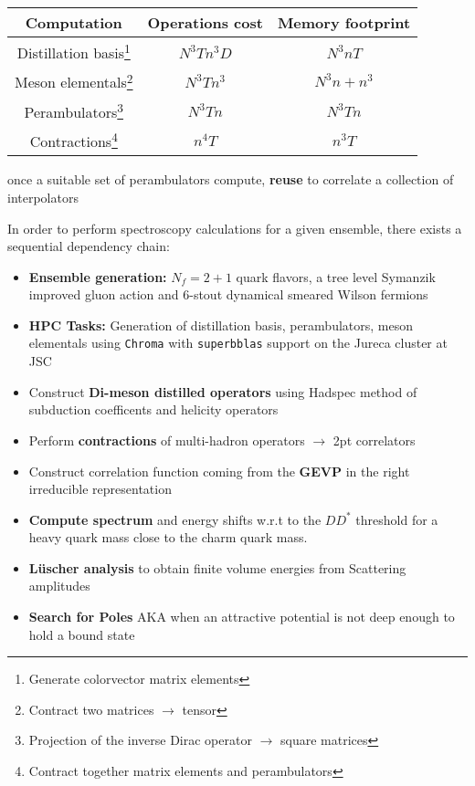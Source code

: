          \begin{minipage}{16cm}
        \hspace*{2em}\begin{tabular}{ccc}
        Computation    & Operations cost & Memory footprint \\ \hline
        Distillation basis\footnote{Generate colorvector matrix elements}& $N^3Tn^3D$         & $N^3nT$      \\
        Meson elementals\footnote{Contract two matrices $\to$ tensor} & $N^3Tn^3$      & $N^3n + n^3$  \\
        Perambulators\footnote{Projection of the inverse Dirac operator $\to$ square matrices} & $N^3Tn$   & $N^3Tn$            \\
        Contractions\footnote{Contract together matrix elements and perambulators}   & $n^4T$    & $n^{3}T$   
        \end{tabular}
        \end{minipage}
        once a suitable set of perambulators compute, \textbf{reuse} to correlate a collection of interpolators
        
In order to perform spectroscopy calculations for a given ensemble, there exists a sequential dependency chain:
\begin{itemize}
     \setlength\itemsep{1em}
        \item[\checkmark] \textbf{Ensemble generation:} $N_f = 2+1$ quark flavors, a tree level Symanzik improved gluon action and 6-stout dynamical smeared Wilson fermions
        \item[\checkmark] \textbf{HPC Tasks:} Generation of distillation basis, perambulators, meson elementals using \texttt{Chroma} with \texttt{superbblas} support on the Jureca cluster at JSC
        \item Construct \textbf{Di-meson distilled operators} using Hadspec method of subduction coefficents and helicity operators
        \item[\checkmark] Perform \textbf{contractions} of multi-hadron operators $\to$ 2pt correlators
        \item Construct correlation function coming from the \textbf{GEVP} in the right irreducible representation
        \item \textbf{Compute spectrum} and energy shifts w.r.t to the $DD^*$ threshold for a heavy quark mass close to the charm quark mass.
        \item \textbf{L\"uscher analysis} to obtain finite volume energies from Scattering amplitudes
        \item \textbf{Search for Poles} AKA when an attractive potential is not deep enough to hold a bound state
    \end{itemize}

